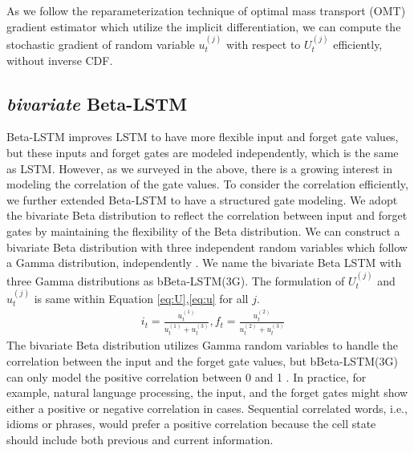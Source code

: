 \documentclass[letterpaper]{article} %
\begin{document}
As we follow the reparameterization technique of optimal mass transport (OMT) gradient estimator \cite{jankowiak2018pathwise} which utilize the implicit differentiation, we can compute the stochastic gradient of random variable $u_{t}^{(j)}$ with respect to $U_{t}^{(j)}$ efficiently, without inverse CDF.


\subsection{\textit{bivariate} Beta-LSTM}
Beta-LSTM improves LSTM to have more flexible input and forget gate values, but these inputs and forget gates are modeled independently, which is the same as LSTM. However, as we surveyed in the above, there is a growing interest in modeling the correlation of the gate values. To consider the correlation efficiently, we further extended Beta-LSTM to have a structured gate modeling. We adopt the bivariate Beta distribution to reflect the correlation between input and forget gates by maintaining the flexibility of the Beta distribution. We can construct a bivariate Beta distribution with three independent random variables which follow a Gamma distribution, independently \cite{OLKIN2003407}. We name the bivariate Beta LSTM with three Gamma distributions as bBeta-LSTM(3G). The formulation of $U_{t}^{(j)}$ and $u_{t}^{(j)}$ is same within Equation \ref{eq:U},\ref{eq:u} for all $j$.
\begin{align}
	&i_{t} = \frac{u_{t}^{(1)}}{u_{t}^{(1)}+u_{t}^{(3)}}, f_{t} = \frac{u_{t}^{(2)}}{u_{t}^{(2)}+u_{t}^{(3)}} \label{eq:3G_input_forget}
\end{align}
%
The bivariate Beta distribution utilizes Gamma random variables to handle the correlation between the input and the forget gate values, but bBeta-LSTM(3G) can only model the positive correlation between 0 and 1 \cite{OLKIN2003407}. 
In practice, for example, natural language processing, the input, and the forget gates might show either a positive or negative correlation in cases. Sequential correlated words, i.e., idioms or phrases, would prefer a positive correlation because the cell state should include both previous and current information. 
\end{document}

